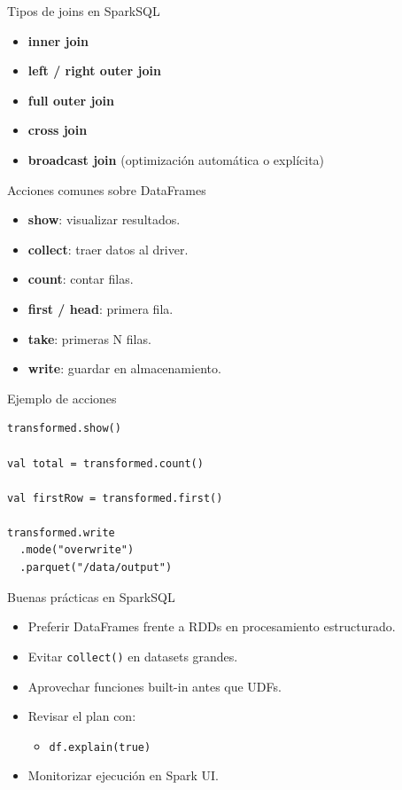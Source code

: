 \documentclass{beamer}
\begin{document}
\begin{frame}{Tipos de joins en SparkSQL}
\begin{itemize}
  \item \textbf{inner join}
  \item \textbf{left / right outer join}
  \item \textbf{full outer join}
  \item \textbf{cross join}
  \item \textbf{broadcast join} (optimización automática o explícita)
\end{itemize}
\end{frame}

\begin{frame}{Acciones comunes sobre DataFrames}
\begin{itemize}
  \item \textbf{show}: visualizar resultados.
  \item \textbf{collect}: traer datos al driver.
  \item \textbf{count}: contar filas.
  \item \textbf{first / head}: primera fila.
  \item \textbf{take}: primeras N filas.
  \item \textbf{write}: guardar en almacenamiento.
\end{itemize}
\end{frame}

\begin{frame}[fragile]{Ejemplo de acciones}
\begin{verbatim}
transformed.show()

val total = transformed.count()

val firstRow = transformed.first()

transformed.write
  .mode("overwrite")
  .parquet("/data/output")
\end{verbatim}
\end{frame}

\begin{frame}{Buenas prácticas en SparkSQL}
\begin{itemize}
  \item Preferir DataFrames frente a RDDs en procesamiento estructurado.
  \item Evitar \texttt{collect()} en datasets grandes.
  \item Aprovechar funciones built-in antes que UDFs.
  \item Revisar el plan con:
  \begin{itemize}
    \item \texttt{df.explain(true)}
  \end{itemize}
  \item Monitorizar ejecución en Spark UI.
\end{itemize}
\end{frame}
\end{document}
